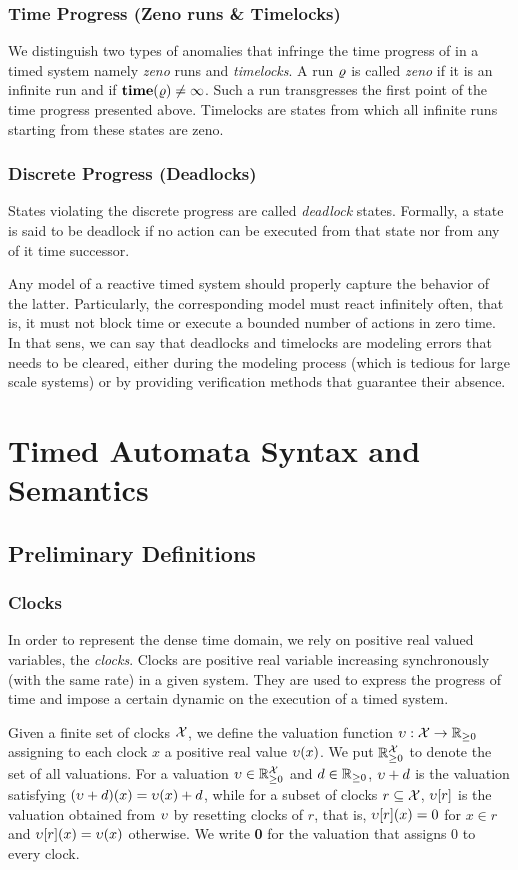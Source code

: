 \subsubsection{Time Progress (Zeno runs \& Timelocks)} 
We distinguish two types of anomalies that infringe the time progress of in
a timed system namely \emph{zeno} runs and \emph{timelocks}.
A run $\varrho$ is called \emph{zeno} if it is 
an infinite run and if $\mathbf{time(\varrho)}\neq\infty$. Such a run transgresses the 
first point of the time progress presented above.
Timelocks are states from which all infinite runs starting from these states
are zeno.
\subsubsection{Discrete Progress (Deadlocks)}
States violating the discrete progress are called \emph{deadlock} states.
Formally, a state is said to be deadlock if no action can be executed from 
that state nor from any of it time successor. 

Any model of a reactive timed system should properly capture the behavior 
of the latter. Particularly, the corresponding model must react infinitely often,
that is, it must not block time or execute a bounded number of actions in zero 
time. In that sens, we can say that deadlocks and timelocks are modeling errors
that needs to be cleared, either during the modeling process (which is tedious 
for large scale systems) or by providing verification methods that guarantee
their absence. 


\section{Timed Automata Syntax and Semantics}
\subsection{Preliminary Definitions}
\subsubsection{Clocks}
In order to represent the dense time domain, we rely on positive 
real valued variables, the \emph{clocks}. Clocks are 
positive real variable increasing synchronously (with the same rate) in a 
given system. They are used to express the progress of time and impose 
a certain dynamic on the execution of a timed system.

Given a finite set of clocks $\mathcal{X}$, we define the valuation function
$\upsilon:\mathcal{X}\to\mathbb{R}_{\ge 0}$ assigning to each clock $x$ a positive real value 
$\upsilon(x)$. We put $\mathbb{R}_{\ge 0}^{\mathcal{X}}$ to denote the set of all valuations.
For a valuation $\upsilon\in\mathbb{R}_{\ge 0}^{\mathcal{X}}$ and $d\in\mathbb{R}_{\ge 0}$, $\upsilon+d$ is the valuation
satisfying $(\upsilon+d)(x)=\upsilon(x)+d$, while for a subset of clocks 
$r\subseteq\mathcal{X}$, $\upsilon[r]$ is the valuation obtained from $\upsilon$ by 
resetting clocks of $r$, that is, $\upsilon[r](x)=0$ for $x\in r$ and
$\upsilon[r](x)=\upsilon(x)$ otherwise. We write {\bf 0} for the valuation 
that assigns 0 to every clock.

